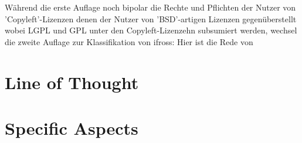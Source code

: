 \documentclass[DIV=calc,BCOR=5mm,11pt,headings=small,oneside,abstract=true, toc=bib]{scrartcl}
\begin{document}
Während die erste Auflage noch bipolar die Rechte und Pflichten
der Nutzer von \glqq{}'Copyleft'-Lizenzen\grqq{} denen der Nutzer von
\glqq{}'BSD'-artigen Lizenzen gegenüberstellt\grqq{} wobei LGPL und GPL unter
den Copyleft-Lizenzehn subsumiert werden, wechsel die zweite Auflage zur
Klassifikation von ifross: Hier ist die Rede von 

\section{Line of Thought}

\section{Specific Aspects}

\small

\end{document}
